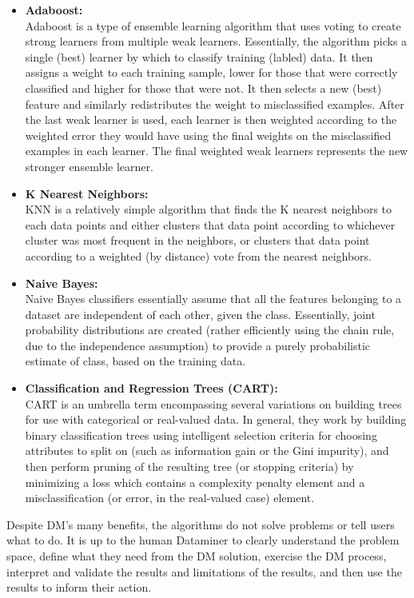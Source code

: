 \documentclass[fleqn,10pt]{SelfArx} %
\begin{document}
\begin{itemize}
	\item{\textbf{Adaboost:}}\\ Adaboost is a type of ensemble learning algorithm that uses voting to create strong learners from multiple weak learners.  Essentially, the algorithm picks a single (best) learner by which to classify training (labled) data.  It then assigns a weight to each training sample, lower for those that were correctly classified and higher for those that were not.  It then selects a new (best) feature and similarly redistributes the weight to misclassified examples.  After the last weak learner is used, each learner is then weighted according to the weighted error they would have using the final weights on the misclassified examples in each learner.  The final weighted weak learners represents the new stronger ensemble learner.
	\item{\textbf{K Nearest Neighbors:}}\\ KNN is a relatively simple algorithm that finds the K nearest neighbors to each data points and either clusters that data point according to whichever cluster was most frequent in the neighbors, or clusters that data point according to a weighted (by distance) vote from the nearest neighbors.
	\item{\textbf{Naive Bayes:}}\\ Naive Bayes classifiers essentially assume that all the features belonging to a dataset are independent of each other, given the class.  Essentially, joint probability distributions are created (rather efficiently using the chain rule, due to the independence assumption) to provide a purely probabilistic estimate of class, based on the training data.
	\item{\textbf{Classification and Regression Trees (CART):}}\\ CART is an umbrella term encompassing several variations on building trees for use with categorical or real-valued data.  In general, they work by building binary classification trees using intelligent selection criteria for choosing attributes to split on (such as information gain or the Gini impurity), and then perform pruning of the resulting tree (or stopping criteria) by minimizing a loss which contains a complexity penalty element and a misclassification (or error, in the real-valued case) element.
\end{itemize}

Despite DM's many benefits, the algorithms do not solve problems or tell users what to do.  It is up to the human Dataminer to clearly understand the problem space, define what they need from the DM solution, exercise the DM process, interpret and validate the results and limitations of the results, and then use the results to inform their action.
\end{document}

